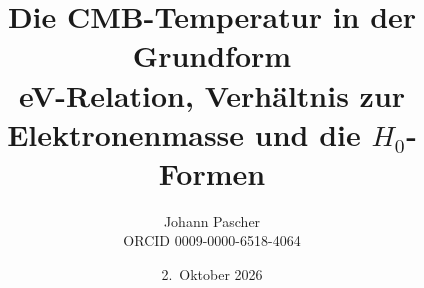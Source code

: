 \documentclass[11pt,a4paper]{report}
\title{Die CMB-Temperatur in der Grundform\\[0.5em]
  \large eV-Relation, Verhältnis zur Elektronenmasse und die $H_0$-Formen}
\date{2.~Oktober 2026}
\author{Johann Pascher\\\small ORCID 0009-0000-6518-4064}
\begin{document}
\renewcommand{\thechapter}{}
\renewcommand{\thesection}{\arabic{section}}
\maketitle
\tableofcontents

\end{document}
